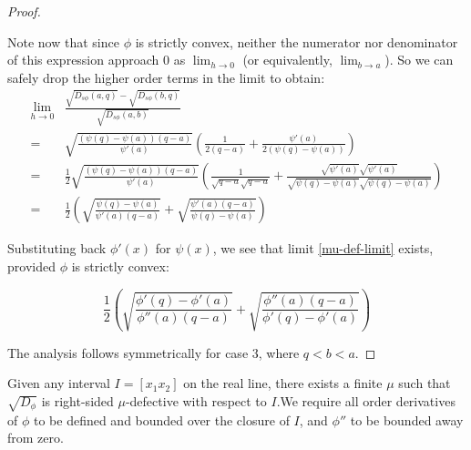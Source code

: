 \documentclass[11pt]{myclass}
\newcommand{\breg}{\ensuremath{D_\phi}}
\newcommand{\sbreg}{\ensuremath{D_{s\phi}}}
\begin{document}
\begin{proof}
\begin{description}
Note now that since $\phi$ is strictly convex, neither the numerator nor denominator of this expression approach $0$ as 
$\lim_{h \to 0}$ (or equivalently, $\lim_{b \to a}$). So we can safely drop the higher order terms in the limit to obtain:
\begin{align*}\lim_{h \to 0} &\frac{\sqrt{\sbreg(a,q)} - \sqrt{\sbreg(b,q)}}{\sqrt{\sbreg(a,b)}} 
\\=& \sqrt{\frac{(\psi(q) - \psi(a))(q-a)}{\psi'(a)}} 
      \left( \frac{1}{2 (q-a)} + \frac{\psi'(a)}{2 (\psi(q) - \psi(a))} \right)
\\=& \frac{1}{2}\sqrt{\frac{(\psi(q) - \psi(a))(q-a)}{\psi'(a)}} 
      \left( \frac{1}{ \sqrt{q-a} \sqrt{q-a}} + \frac{\sqrt{\psi'(a)} \sqrt{\psi'(a)}}{ \sqrt{\psi(q) - \psi(a)}
      \sqrt{\psi(q) - \psi(a)}} \right)      
\\=& \frac{1}{2} \left( \sqrt{\frac{\psi(q) - \psi(a)}{\psi'(a)(q-a)}} + \sqrt{\frac{\psi'(a)(q-a)}{\psi(q) - \psi(a)}} \right) \end{align*}

Substituting back $\phi'(x)$ for $\psi(x)$, we see that limit \ref{mu-def-limit} exists, provided $\phi$ is strictly convex:

\begin{equation}
\frac{1}{2} \left( \sqrt{\frac{\phi'(q) - \phi'(a)}{\phi''(a)(q-a)}} 
                  + \sqrt{\frac{\phi''(a)(q-a)}{\phi'(q) - \phi'(a)}} \right)
\end{equation}

\end{description}
The analysis follows symmetrically for case 3, where $q < b < a$.\qedhere
\end{proof}


\begin{lemma}\label{app:2}
Given any interval $I=[x_1 x_2]$ on the real line, there exists a finite $\mu$ such that  $\sqrt{\breg}$ is right-sided $\mu$-defective with respect to $I$.We require all order derivatives of $\phi$ to be defined and bounded over the closure of $I$,
and $\phi''$ to be bounded away from zero. 
\end{lemma}
\end{document}
